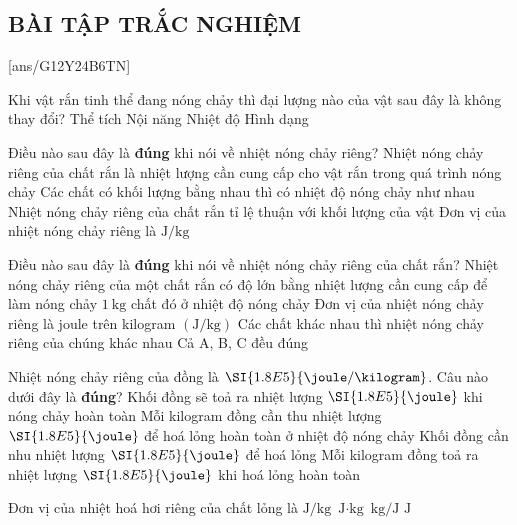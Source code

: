 \subsection{BÀI TẬP TRẮC NGHIỆM}
\setcounter{ex}{0}
[ans/G12Y24B6TN]		
\begin{ex}
Khi vật rắn tinh thể đang nóng chảy thì đại lượng nào của vật sau đây là không thay đổi?	
\choice
{Thể tích}
{Nội năng}
{\True Nhiệt độ}
{Hình dạng}
\loigiai{}
\end{ex}
\begin{ex}
	Điều nào sau đây là \textbf{đúng} khi nói về nhiệt nóng chảy riêng?
	\choice
	{Nhiệt nóng chảy riêng của chất rắn là nhiệt lượng cần cung cấp cho vật rắn trong quá trình nóng chảy}
	{Các chất có khối lượng bằng nhau thì có nhiệt độ nóng chảy như nhau}
	{Nhiệt nóng chảy riêng của chất rắn tỉ lệ thuận với khối lượng của vật}
	{\True Đơn vị của nhiệt nóng chảy riêng là $\si{\joule/\kilogram}$}
	\loigiai{}
\end{ex}
\begin{ex}
Điều nào sau đây là \textbf{đúng} khi nói về nhiệt nóng chảy riêng của chất rắn?
	\choice
	{Nhiệt nóng chảy riêng của một chất rắn có độ lớn bằng nhiệt lượng cần cung cấp để làm nóng chảy $\SI{1}{\kilogram}$ chất đó ở nhiệt độ nóng chảy}
	{Đơn vị của nhiệt nóng chảy riêng là joule trên kilogram $\left(\si{\joule/\kilogram}\right)$}
	{Các chất khác nhau thì nhiệt nóng chảy riêng của chúng khác nhau}
	{\True Cả A, B, C đều đúng}
	\loigiai{}
\end{ex}
\begin{ex}
	Nhiệt nóng chảy riêng của đồng là $\SI{1.8E5}{\joule/\kilogram}$. Câu nào dưới đây là \textbf{đúng}?
	\choice
	{Khối đồng sẽ toả ra nhiệt lượng $\SI{1.8E5}{\joule}$ khi nóng chảy hoàn toàn}
	{\True Mỗi kilogram đồng cần thu nhiệt lượng $\SI{1.8E5}{\joule}$ để hoá lỏng hoàn toàn ở nhiệt độ nóng chảy}
	{Khối đồng cần nhu nhiệt lượng $\SI{1.8E5}{\joule}$ để hoá lỏng}
	{Mỗi kilogram đồng toả ra nhiệt lượng $\SI{1.8E5}{\joule}$ khi hoá lỏng hoàn toàn}
	\loigiai{}
\end{ex}
\begin{ex}
	Đơn vị của nhiệt hoá hơi riêng của chất lỏng là
	\choice
	{\True $\si{\joule/\kilogram}$}
	{$\si{\joule\cdot\kilogram}$}
	{$\si{\kilogram/\joule}$}
	{$\si{\joule}$}
	\loigiai{}
\end{ex}
